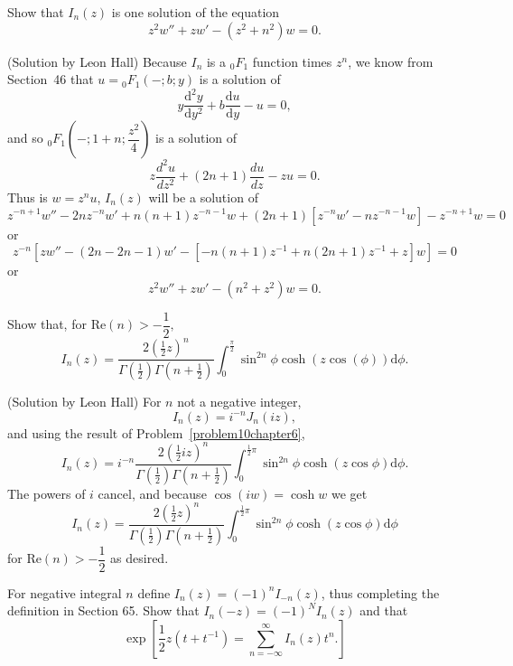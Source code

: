 \begin{problem} \label{problem15chapter6}
Show that $I_n(z)$ is one solution of the equation
$$z^2 w'' + zw' - (z^2+n^2)w = 0.$$
\end{problem}
\begin{solution}(Solution by Leon Hall)
Because $I_n$ is a ${}_0F_1$ function times $z^n$, we know from Section~46 that $u={}_0F_1(-;b;y)$ is a solution of
$$y \dfrac{\mathrm{d}^2y}{\mathrm{d}y^2} + b \dfrac{\mathrm{d}u}{\mathrm{d}y} - u = 0,$$
and so ${}_0F_1 \left( -; 1+n; \dfrac{z^2}{4} \right)$ is a solution of
$$z \dfrac{d^2u}{dz^2} + (2n+1) \dfrac{du}{dz} - zu=0.$$
Thus is $w = z^nu$, $I_n(z)$ will be a solution of 
$$z^{-n+1} w'' - 2nz^{-n} w' + n(n+1) z^{-n-1}w + (2n+1) [z^{-n}w'- nz^{-n-1}w] - z^{-n+1}w=0$$
or
$$z^{-n}[zw'' - (2n-2n-1)w' - [-n(n+1)z^{-1} + n(2n+1)z^{-1}+z]w] = 0$$
or
$$z^2 w'' + zw' - (n^2+z^2)w=0.$$
\end{solution}
\begin{problem} \label{problem16chapter6}
Show that, for $\mathrm{Re}(n) > -\dfrac{1}{2},$
$$I_n(z) = \dfrac{2 \left( \frac{1}{2} z \right)^n}{\Gamma \left(\frac{1}{2} \right) \Gamma \left( n + \frac{1}{2} \right)} \displaystyle\int_0^{\frac{\pi}{2}} \sin^{2n} \phi \cosh(z \cos(\phi)) \mathrm{d} \phi.$$
\end{problem}
\begin{solution}(Solution by Leon Hall)
For $n$ not a negative integer,
$$I_n(z) = i^{-n} J_n(iz),$$
and using the result of Problem~\ref{problem10chapter6},
$$I_n(z) = i^{-n} \dfrac{2(\frac{1}{2}iz)^n}{\Gamma(\frac{1}{2}) \Gamma(n+\frac{1}{2})} \displaystyle\int_0^{\frac{1}{2}\pi} \sin^{2n} \phi \cosh(z \cos \phi) \mathrm{d}\phi.$$
The powers of $i$ cancel, and because $\cos(iw) = \cosh w$ we get
$$I_n(z) = \dfrac{2(\frac{1}{2}z)^n}{\Gamma(\frac{1}{2}) \Gamma(n+\frac{1}{2})} \displaystyle\int_0^{\frac{1}{2}\pi} \sin^{2n} \phi \cosh(z \cos \phi) \mathrm{d} \phi$$
for $\mathrm{Re}(n) > -\dfrac{1}{2}$ as desired.
\end{solution}
\begin{problem} \label{problem17chapter6}
For negative integral $n$ define $I_n(z) = (-1)^n I_{-n}(z)$, thus completing the definition in Section 65. Show that $I_n(-z) = (-1)^N I_n(z)$ and that
$$\exp \left[ \dfrac{1}{2} z(t+t^{-1}) = \displaystyle\sum_{n=-\infty}^{\infty}I_n(z) t^n. \right]$$
\end{problem}
